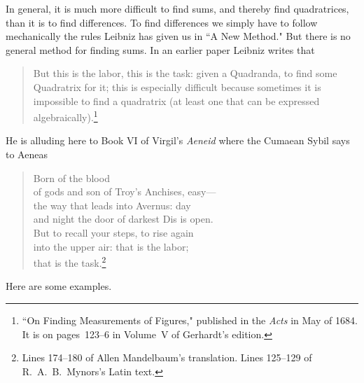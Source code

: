 \documentclass[twoside,openright]{article}
\begin{document}
In general, it is much more difficult to find sums, and thereby find quadratrices, than it is to find differences.  To find differences we simply have to follow mechanically the rules Leibniz has given us in ``A New Method."  But there is no general method for finding sums.  In an earlier paper Leibniz writes that 
\begin{quote}
But this is the labor, this is the
task: given a Quadranda, to find some Quadratrix for it; this is especially difficult because sometimes it is
impossible to find a quadratrix (at least one that can be expressed
algebraically).\footnote{``On Finding Measurements of Figures," published in the {\em Acts} in May of 1684.  It is on pages~123--6 in Volume~V of Gerhardt's edition.}
\end{quote}
He is alluding here to Book VI of Virgil's {\em Aeneid} where the Cumaean Sybil says to Aeneas
\begin{verse}
Born of the blood \\
of gods and son of Troy's Anchises, easy---\\
the way that leads into Avernus: day \\
and night the door of darkest Dis is open.\\
But to recall your steps, to rise again \\
into the upper air: that is the labor;\\
that is the task.\footnote{Lines 174--180 of Allen Mandelbaum's translation.  Lines 125--129 of R.\ A.\ B.\ Mynors's Latin text.}
\end{verse}

Here are some examples.
\end{document}
